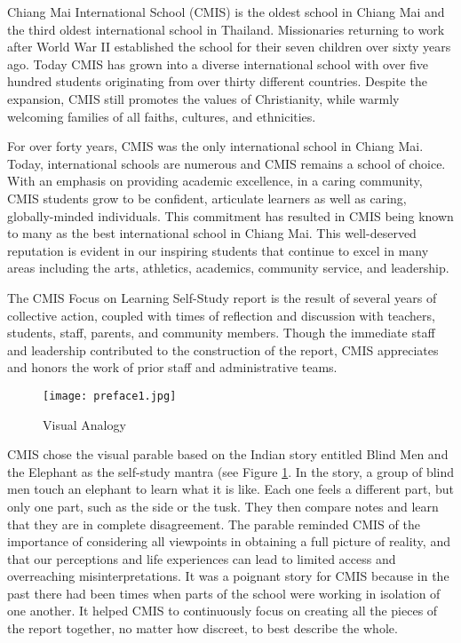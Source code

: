 Chiang Mai International School (CMIS) is the oldest school in Chiang Mai and the third oldest international school in Thailand. Missionaries returning to work after World War II established the school for their seven children over sixty years ago. Today CMIS has grown into a diverse international school with over five hundred students originating from over thirty different countries. Despite the expansion, CMIS still promotes the values of Christianity, while warmly welcoming families of all faiths, cultures, and ethnicities. 

For over forty years, CMIS was the only international school in Chiang Mai. Today, international schools are numerous and CMIS remains a school of choice. With an emphasis on providing academic excellence, in a caring community, CMIS students grow to be confident, articulate learners as well as caring, globally-minded individuals. This commitment has resulted in CMIS being known to many as the best international school in Chiang Mai. This well-deserved reputation is evident in our inspiring students that continue to excel in many areas including the arts, athletics, academics, community service, and leadership. 

The CMIS Focus on Learning Self-Study report is the result of several years of collective action, coupled with times of reflection and discussion with teachers, students, staff, parents, and community members. Though the immediate staff and leadership contributed to the construction of the report, CMIS appreciates and honors the work of prior staff and administrative teams. 

\begin{figure}[h!]
\centering
\texttt{[image: preface1.jpg]}
\caption{Visual Analogy}
\label{figure:analogy}
\end{figure}

CMIS chose the visual parable based on the Indian story entitled Blind Men and the Elephant as the self-study mantra (see Figure \ref{figure:analogy}. In the story, a group of blind men touch an elephant to learn what it is like. Each one feels a different part, but only one part, such as the side or the tusk. They then compare notes and learn that they are in complete disagreement. The parable reminded CMIS of the importance of considering all viewpoints in obtaining a full picture of reality, and that our perceptions and life experiences can lead to limited access and overreaching misinterpretations. It was a poignant story for CMIS because in the past there had been times when parts of the school were working in isolation of one another. It helped CMIS to continuously focus on creating all the pieces of the report together, no matter how discreet, to best describe the whole. 

